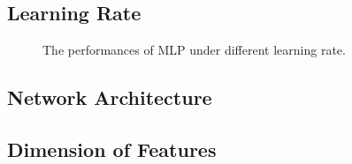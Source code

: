 \documentclass[12pt,a4paper]{article}
\theoremstyle{definition}
\begin{document}
\subsection{Learning Rate}

\begin{figure}[H]
	\centering
	\caption{The performances of MLP under different learning rate.}
	\label{fig:mlp-lr}
\end{figure}

\subsection{Network Architecture}

\subsection{Dimension of Features}
\end{document}
